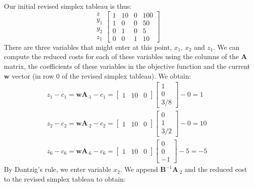 \begin{example}
Our initial revised simplex tableau is thus:
\begin{equation}
\begin{array}{c}
z\\
y_1\\
y_2\\
z_1
\end{array}
\left[
\begin{array}{ccc|c}
1	&	10	&	0	&	100\\
\hline
1	&	0	&	0	&	50\\
0	&	1	&	0	&	5\\
0	&	0	&	1	&	10
\end{array}
\right]
\end{equation}
There are three variables that might enter at this point, $x_1$, $x_2$ and $z_1$. We can compute the reduced costs for each of these variables using the columns of the $\mathbf{A}$ matrix, the coefficients of these variables in the objective function and the current $\mathbf{w}$ vector (in row 0 of the revised simplex tableau). We obtain:
\begin{gather*}
z_1 - c_1 = \mathbf{w}\mathbf{A}_{\cdot 1} - c_1 = 
	\begin{bmatrix}1&10&0\end{bmatrix}
	\begin{bmatrix}1\\0\\3/8\end{bmatrix} - 0 = 1\\
z_2 - c_2 = \mathbf{w}\mathbf{A}_{\cdot 2} - c_2 = 
	\begin{bmatrix}1&10&0\end{bmatrix}
	\begin{bmatrix}0\\1\\3/2\end{bmatrix} - 0 = 10\\
z_6 - c_6 = \mathbf{w}\mathbf{A}_{\cdot 6} - c_6 = 
	\begin{bmatrix}1&10&0\end{bmatrix}
	\begin{bmatrix}0\\0\\-1\end{bmatrix} - 5 = -5
\end{gather*}
By Dantzig's rule, we enter variable $x_2$. We append $\mathbf{B}^{-1}\mathbf{A}_{\cdot 2}$ and the reduced cost to the revised simplex tableau to obtain:
\begin{equation}

\end{equation}
\end{example}
